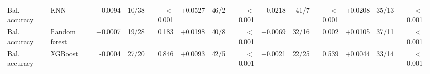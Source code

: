 \begin{table}[tbp]
\begin{adjustbox}{max width=\linewidth}
\begin{tabular}{llrrrrrrrrrrrr}
Bal. accuracy & KNN & -0.0094 & 10/38 & $<$0.001 & +0.0527 & 46/2 & $<$0.001 & +0.0218 & 41/7 & $<$0.001 & +0.0208 & 35/13 & $<$0.001 \\
Bal. accuracy & Random forest & +0.0007 & 19/28 & 0.183 & +0.0198 & 40/8 & $<$0.001 & +0.0069 & 32/16 & 0.002 & +0.0105 & 37/11 & $<$0.001 \\
Bal. accuracy & XGBoost & -0.0004 & 27/20 & 0.846 & +0.0093 & 42/5 & $<$0.001 & +0.0021 & 22/25 & 0.539 & +0.0044 & 33/14 & $<$0.001 \\
\bottomrule
\end{tabular}
\end{adjustbox}
\end{table}

